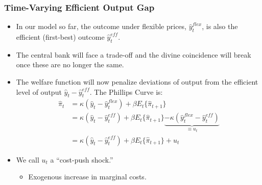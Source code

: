 \documentclass[english,xcolor=svgnames]{beamer}
\begin{document}
\begin{frame}
\frametitle{Time-Varying Efficient Output Gap}
\begin{itemize}
	\item In our model so far, the outcome under flexible prices, $\hat{y}_t^{flex}$, is also the efficient (first-best) outcome $\hat{y}_t^{eff}$.
	\item The central bank will face a trade-off and the divine coincidence will break once these are no longer the same.
	\item The welfare function will now penalize deviations of output from the efficient level of output $\hat{y}_t - \hat{y}_t^{eff}$. The Phillips Curve is:
		\begin{align*}
			\hat{\pi}_t&=\kappa (\hat{y}_t - \hat{y}_t^{flex}) +\beta E_t \{\hat{\pi}_{t+1}\} \\
			&= \kappa (\hat{y}_t - \hat{y}_t^{eff}) +\beta E_t \{\hat{\pi}_{t+1}\} \underbrace{- \kappa (\hat{y}_t^{flex} - \hat{y}_t^{eff})}_{\equiv u_t} \\
			&= \kappa (\hat{y}_t - \hat{y}_t^{eff}) +\beta E_t \{\hat{\pi}_{t+1}\} + u_t
		\end{align*}
 	\item We call $u_t$ a ``cost-push shock.''
 	\begin{itemize}
 		\item Exogenous increase in marginal costs.
 	\end{itemize}
\end{itemize}
\end{frame}
\end{document}
